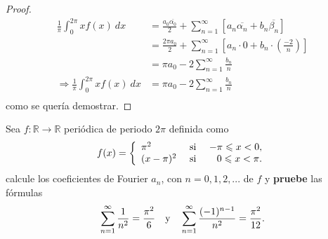 \documentclass[12pt]{report}
\newcounter{it}
\theoremstyle{largebreak}
\renewcommand{\leq}{\ensuremath{\leqslant}}
\newcommand\cf[3]{\ensuremath{#1:#2\rightarrow#3}}
\begin{document}
\begin{proof}
        \begin{equation*}
            \begin{split}
                \frac{1}{\pi}\int_{0}^{2\pi}xf(x)\:dx&=\frac{a_0\overline{\alpha_0}}{2}+\sum_{n=1}^\infty\left[a_n\overline{\alpha_n}+b_n\overline{\beta_n}\right]\\
                &=\frac{2\pi a_0}{2}+\sum_{n=1}^\infty\left[a_n\cdot 0+b_n\cdot\left(\frac{-2}{n}\right)\right]\\
                &=\pi a_0-2\sum_{ n=1}^\infty\frac{b_n}{n}\\
                \Rightarrow \frac{1}{\pi}\int_{0}^{2\pi}xf(x)\:dx&=\pi a_0-2\sum_{ n=1}^\infty\frac{b_n}{n}\\
            \end{split}
        \end{equation*}
        como se quería demostrar.
    \end{proof}

    \begin{excer}
        Sea $\cf{f}{\mathbb{R}}{\mathbb{R}}$ periódica de periodo $2\pi$ definida como
        \begin{equation*}
            f(x)=\left\{
                \begin{array}{lcr}
                    \pi^2 & \textup{ si } & -\pi\leq x<0,\\
                    (x-\pi)^2 & \textup{ si } & 0\leq x <\pi.
                \end{array}
            \right.
        \end{equation*}
        calcule los coeficientes de Fourier $a_n$, con $n=0,1,2,...$ de $f$ y \textbf{pruebe} las fórmulas
        \begin{equation*}
            \sum_{ n=1}^\infty\frac{1}{n^2}=\frac{\pi^2}{6}\quad\textup{y}\quad\sum_{ n=1}^\infty\frac{(-1)^{ n-1}}{n^2}=\frac{\pi^2}{12}.
        \end{equation*}
    \end{excer}
\end{document}

